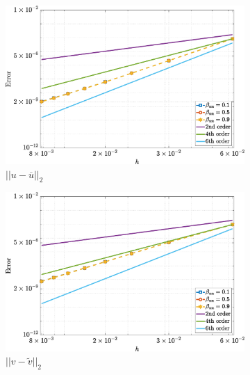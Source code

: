\documentclass[preprint, 12pt]{elsarticle}
\begin{document}
\begin{figure}[H]
    \centering  
    \begin{subfigure}[b]{.46\textwidth}
        \includegraphics[width=\textwidth]{NormErr_2nd_Re_100_Wi_1_epsilon_0_xi_0_alphaG_0.1_Dt_1e-06_at_0.05_tipsim_1_MMS_12_U.eps}
        \caption{$||u - \overline{u}||_{2}$}
        \label{error_u_2nd_Case1_giesekus_alphaG_0.1}
    \end{subfigure}
    \vspace{0.2cm}
    \qquad
    \begin{subfigure}[b]{.46\textwidth}
        \includegraphics[width=\textwidth]{NormErr_2nd_Re_100_Wi_1_epsilon_0_xi_0_alphaG_0.1_Dt_1e-06_at_0.05_tipsim_1_MMS_12_V.eps}
        \caption{$||v - \widetilde{v}||_{2}$}
        \label{error_v_2nd_Case1_giesekus_alphaG_0.1}
    \end{subfigure}
    \qquad
    \begin{subfigure}[b]{.46\textwidth}

\end{subfigure}
\end{figure}
\end{document}
